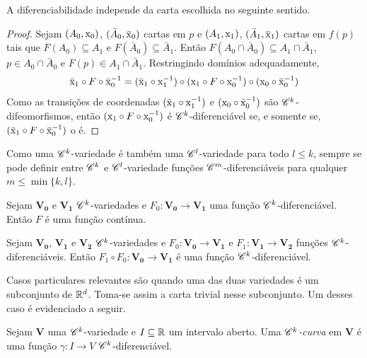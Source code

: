 A diferenciabilidade independe da carta escolhida no seguinte sentido.

\begin{proof}
Sejam $(A_0,\mathrm{x}_0)$, $(\bar A_0,\bar{\mathrm{x}}_0)$ cartas em $p$ e $(A_1,\mathrm{x}_1)$, $(\bar A_1,\bar{\mathrm{x}}_1)$ cartas em $f(p)$ tais que $F(A_0) \subseteq A_1$ e $F(\bar A_0) \subseteq \bar A_1$. Então $F(A_0 \cap \bar A_0) \subseteq A_1 \cap \bar A_1$, $p \in A_0 \cap \bar A_0$ e $F(p) \in A_1 \cap \bar A_1$. Restringindo domínios adequadamente,
	\begin{equation*}
	\bar {\mathrm{x}}_1 \circ F \circ \bar {\mathrm{x}}_0^{-1} = (\bar {\mathrm{x}}_1 \circ \mathrm{x}_1^{-1}) \circ (\mathrm{x}_1 \circ F \circ \mathrm{x}_0 ^{-1}) \circ (\mathrm{x}_0 \circ \bar {\mathrm{x}}_0^{-1})
	\end{equation*}
Como as transições de coordenadas $(\bar {\mathrm{x}}_1 \circ \mathrm{x}_1^{-1})$ e $(\mathrm{x}_0 \circ \bar {\mathrm{x}}_0^{-1})$ são $\mathscr{C}^k$-difeomorfismos, então $(\mathrm{x}_1 \circ F \circ \mathrm{x}_0 ^{-1})$ é $\mathscr{C}^k$-diferenciável se, e somente se, $(\bar {\mathrm{x}}_1 \circ F \circ \bar {\mathrm{x}}_0^{-1})$ o é.
\end{proof}

Como uma $\mathscr{C}^k$-variedade é também uma $\mathscr{C}^l$-variedade para todo $l\leq k$, sempre se pode definir entre $\mathscr{C}^k$ e $\mathscr{C}^l$-variedade funções $\mathscr{C}^m$-diferenciáveis para qualquer $m \leq \min\{k,l\}$.

\begin{prop}
Sejam $\bm{V_0}$ e $\bm{V_1}$ $\mathscr{C}^k$-variedades e $F_0: \bm{V_0} \to \bm{V_1}$ uma função $\mathscr{C}^k$-diferenciável. Então $F$ é uma função contínua.
\end{prop}

\begin{prop}
Sejam $\bm{V_0}$, $\bm{V_1}$ e $\bm{V_2}$ $\mathscr{C}^k$-variedades e $F_0: \bm{V_0} \to \bm{V_1}$ e $F_1: \bm{V_1} \to \bm{V_2}$ funções $\mathscr{C}^k$-diferenciáveis. Então $F_1 \circ F_0: \bm{V_0} \to \bm{V_1}$ é uma função $\mathscr{C}^k$-diferenciável.
\end{prop}

Casos particulares relevantes são quando uma das duas variedades é um subconjunto de $\mathbb{R}^d$. Toma-se assim a carta trivial nesse subconjunto. Um desses caso é evidenciado a seguir.

\begin{defi}
Sejam $\bm V$ uma $\mathscr{C}^k$-variedade e $I \subseteq \mathbb{R}$ um intervalo aberto. Uma \emph{$\mathscr{C}^k$-curva} em $\bm V$ é uma função $\gamma: I \to V$ $\mathscr{C}^k$-diferenciável.
\end{defi}

